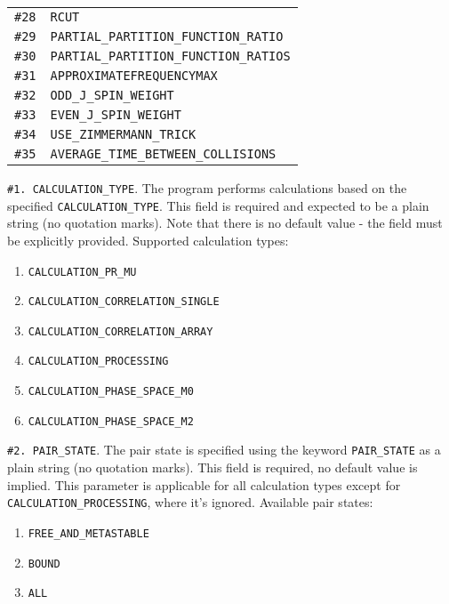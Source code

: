 \documentclass[color]{article}
\begin{document}
\begin{table}[H]
\begin{tabular}{ll}
    \texttt{\#28} & \texttt{RCUT} \\
    \texttt{\#29} & \texttt{PARTIAL\_PARTITION\_FUNCTION\_RATIO} \\
    \texttt{\#30} & \texttt{PARTIAL\_PARTITION\_FUNCTION\_RATIOS} \\
    \texttt{\#31} & \texttt{APPROXIMATEFREQUENCYMAX} \\
    \texttt{\#32} & \texttt{ODD\_J\_SPIN\_WEIGHT} \\
    \texttt{\#33} & \texttt{EVEN\_J\_SPIN\_WEIGHT} \\
    \texttt{\#34} & \texttt{USE\_ZIMMERMANN\_TRICK} \\
    \texttt{\#35} & \texttt{AVERAGE\_TIME\_BETWEEN\_COLLISIONS} \\
  \end{tabular}
\end{table}

\noindent
\texttt{\#1. CALCULATION\_TYPE}. The program performs calculations based on the specified \texttt{CALCULATION\_TYPE}. This field is required and expected to be a plain string (no quotation marks). Note that there is no default value - the field must be explicitly provided. Supported calculation types:

\begin{enumerate}[itemsep=-3pt]
    \item \texttt{CALCULATION\_PR\_MU} 
    \item \texttt{CALCULATION\_CORRELATION\_SINGLE} 
    \item \texttt{CALCULATION\_CORRELATION\_ARRAY}
    \item \texttt{CALCULATION\_PROCESSING} 
    \item \texttt{CALCULATION\_PHASE\_SPACE\_M0}
    \item \texttt{CALCULATION\_PHASE\_SPACE\_M2}
\end{enumerate}

\noindent
\texttt{\#2. PAIR\_STATE}. The pair state is specified using the keyword \texttt{PAIR\_STATE} as a plain string (no quotation marks). This field is required, no default value is implied. This parameter is applicable for all calculation types except for \texttt{CALCULATION\_PROCESSING}, where it's ignored. Available pair states: 

\begin{enumerate}[itemsep=-3pt]
    \item \texttt{FREE\_AND\_METASTABLE}
    \item \texttt{BOUND}
    \item \texttt{ALL}
\end{enumerate}
\end{document}
